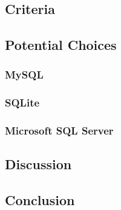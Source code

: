 \documentclass[onecolumn, draftclsnofoot,10pt, compsoc]{IEEEtran}
\begin{document}
\subsection{Criteria}

\subsection{Potential Choices}

\subsubsection{MySQL}

\subsubsection{SQLite}

\subsubsection{Microsoft SQL Server}

\subsection{Discussion}

\subsection{Conclusion}
\end{document}
